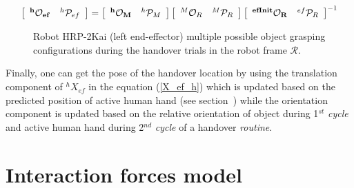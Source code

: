 \begin{gather}\label{X_efinit_hori}
\left[\begin{array}{cc}
\bf{{}^{h}\mathcal{O}_{ef}} & {}^{h}\mathcal{P}_{ef}
\end{array}\right] =
\left[\begin{array}{cc}
\bf{{}^{h}\mathcal{O}_M} & {}^{h}\mathcal{P}_M
\end{array}\right]
\left[\begin{array}{cc}
{}^{M}\mathcal{O}_R & {}^{M}\mathcal{P}_R
\end{array}\right]
\left[\begin{array}{cc}
\bf{{}^{efInit}\mathcal{O}_{R}} & {}^{ef}\mathcal{P}_{R}
\end{array}\right]^{-1}
\end{gather}


\begin{figure}[ht]
	\caption{Robot HRP-2Kai (left end-effector) multiple possible object grasping configurations during the handover trials in the robot frame $\mathcal{R}$.}
	\label{fig:robot_lt_orientations}
\end{figure} 

Finally, one can get the pose of the handover location by using the translation component of ${}^{h}{X}_{ef} $ in the equation (\ref{X_ef_h}) which is updated based on the predicted position of active human hand (see section~) while the orientation component is updated based on the relative orientation of object during 1$^{st}$ \textit{cycle} and active human hand during 2$^{nd}$ \textit{cycle} of a handover \textit{routine}.

\clearpage

\section{Interaction forces model}\label{interaction model}

